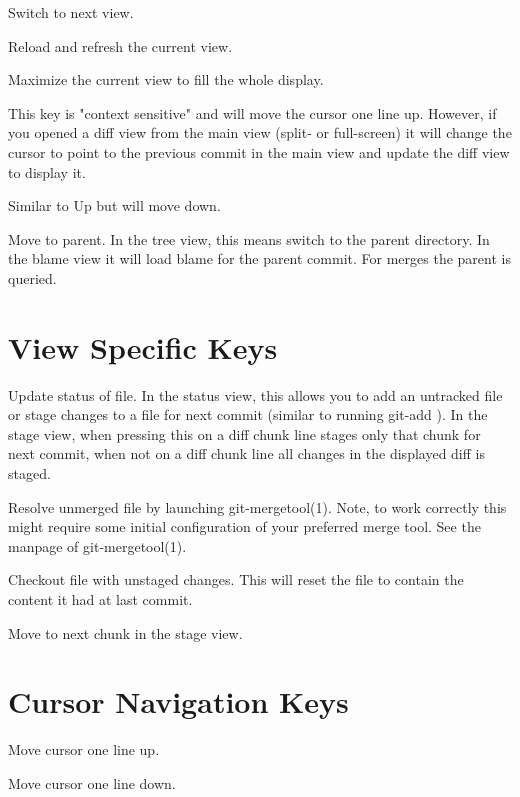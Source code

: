  {Switch to next view.}

 {Reload and refresh the current view.}

 {Maximize the current view to fill the whole
               display.}

 {This key is "context sensitive" and will
               move the cursor one line up. However, if you
               opened a diff view from the main view
               (split- or full-screen) it will change the
               cursor to point to the previous commit in
               the main view and update the diff view to
               display it.}

 {Similar to Up but will move down.}

\cmdS{,} {Move to parent. In the tree view, this means
               switch to the parent directory. In the blame
               view it will load blame for the parent
               commit. For merges the parent is queried.}


\section{View Specific Keys}
 {Update status of file. In the status view,
             this allows you to add an untracked file or
             stage changes to a file for next commit
             (similar to running git-add ). In
             the stage view, when pressing this on a diff
             chunk line stages only that chunk for next
             commit, when not on a diff chunk line all
             changes in the displayed diff is staged.}

 {Resolve unmerged file by launching
             git-mergetool(1). Note, to work correctly
             this might require some initial
             configuration of your preferred merge tool.
             See the manpage of git-mergetool(1).}

\cmdS{!} {Checkout file with unstaged changes. This
             will reset the file to contain the content
             it had at last commit.}

 {Move to next chunk in the stage view.}


\section{Cursor Navigation Keys}
 {Move cursor one line up.}

 {Move cursor one line down.}

